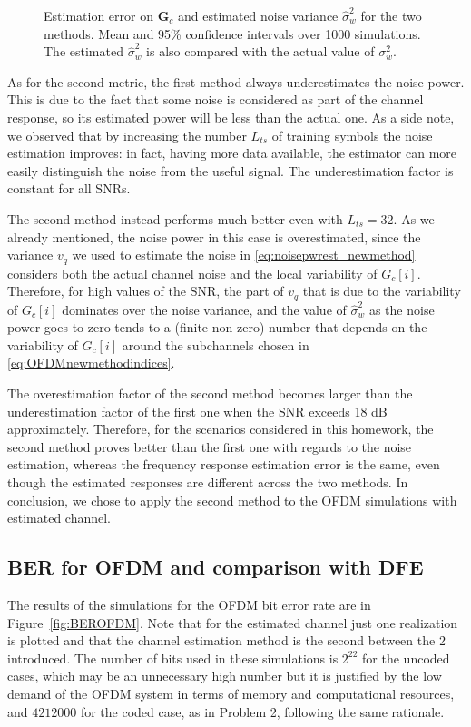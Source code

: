 \documentclass[10pt]{article}
\begin{document}
\begin{figure}
\begin{minipage}{0.49\textwidth}
\end{minipage}
\caption{Estimation error on $\mathbf{G}_c$ and estimated noise variance $\hat{\sigma}_w^2$ for the two methods. Mean and 95\% confidence intervals over 1000 simulations. The estimated $\hat{\sigma}_w^2$ is also compared with the actual value of $\sigma_w^2$.}
\label{fig:p3_comparison}
\end{figure}

As for the second metric, the first method always underestimates the noise power. This is due to the fact that some noise is considered as part of the channel response, so its estimated power will be less than the actual one. As a side note, we observed that by increasing the number $L_{ts}$ of training symbols the noise estimation improves: in fact, having more data available, the estimator can more easily distinguish the noise from the useful signal. The underestimation factor is constant for all SNRs.

The second method instead performs much better even with $L_{ts} \! = \! 32$. As we already mentioned, the noise power in this case is overestimated, since the variance $v_q$ we used to estimate the noise in \eqref{eq:noisepwrest_newmethod} considers both the actual channel noise and the local variability of $G_c [i]$. Therefore, for high values of the SNR, the part of $v_q$ that is due to the variability of $G_c [i]$ dominates over the noise variance, and the value of $\hat{\sigma}_w^2$ as the noise power goes to zero tends to a (finite non-zero) number that depends on the variability of $G_c[i]$ around the subchannels chosen in \eqref{eq:OFDMnewmethodindices}.

The overestimation factor of the second method becomes larger than the underestimation factor of the first one when the SNR exceeds 18 dB approximately. Therefore, for the scenarios considered in this homework, the second method proves better than the first one with regards to the noise estimation, whereas the frequency response estimation error is the same, even though the estimated responses are different across the two methods. In conclusion, we chose to apply the second method to the OFDM simulations with estimated channel.

\subsection*{BER for OFDM and comparison with DFE}
The results of the simulations for the OFDM bit error rate are in Figure~\ref{fig:BEROFDM}. Note that for the estimated channel just one realization is plotted and that the channel estimation method is the second between the 2 introduced. The number of bits used in these simulations is $2^{22}$ for the uncoded cases, which may be an unnecessary high number but it is justified by the low demand of the OFDM system in terms of memory and computational resources, and $4212000$ for the coded case, as in Problem 2, following the same rationale.
\end{document}
